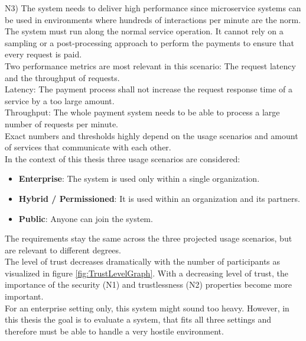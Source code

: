 \documentclass[a4paper,12pt]{scrartcl}
\begin{document}
N3) The system needs to deliver high performance since microservice systems can be used in environments where hundreds of interactions per minute are the norm. The system must run along the normal service operation. It cannot rely on a sampling or a post-processing approach to perform the payments to ensure that every request is paid.\\
Two performance metrics are most relevant in this scenario: The request latency and the throughput of requests.\\
Latency: The payment process shall not increase the request response time of a service by a too large amount.\\
Throughput: The whole payment system needs to be able to process a large number of requests per minute.\\
Exact numbers and thresholds highly depend on the usage scenarios and amount of services that communicate with each other.\\

In the context of this thesis three usage scenarios are considered:

\begin{itemize}
\item \textbf{Enterprise}: The system is used only within a single organization.
\item \textbf{Hybrid / Permissioned}: It is used within an organization and its partners.
\item \textbf{Public}: Anyone can join the system.
\end{itemize}

The requirements stay the same across the three projected usage scenarios, but are relevant to different degrees.\\
The level of trust decreases dramatically with the number of participants as visualized in figure \ref{fig:TrustLevelGraph}. With a decreasing level of trust, the importance of the security (N1) and trustlessness (N2) properties become more important.\\
For an enterprise setting only, this system might sound too heavy. However, in this thesis the goal is to evaluate a system, that fits all three settings and therefore must be able to handle a very hostile environment.
\end{document}
